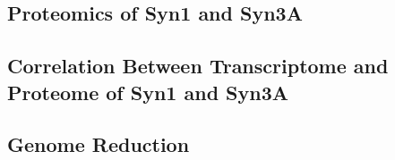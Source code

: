 \subsection{Proteomics of Syn1 and Syn3A}


\subsection{Correlation Between Transcriptome and Proteome of Syn1 and Syn3A}


\subsection{Genome Reduction}


\newpage
